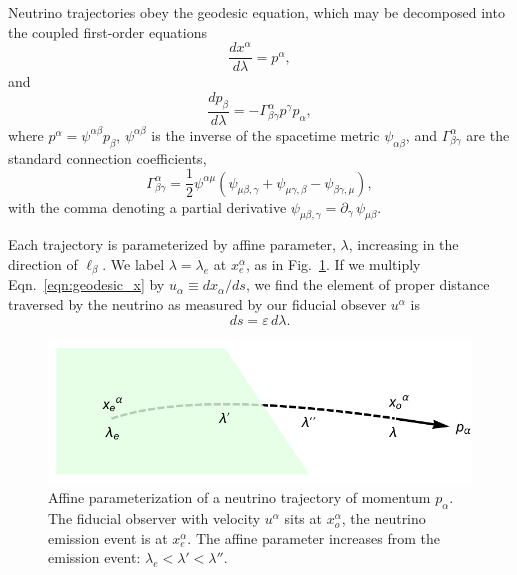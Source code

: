 \documentclass[aps,floatfix,prd,superscriptaddress,twocolumn]{revtex4-1}
\begin{document}
Neutrino trajectories obey the geodesic equation, which may be decomposed into
the coupled first-order equations
\begin{equation}
\label{eqn:geodesic_x}
  \frac{d x^\alpha}{d\lambda} = p^\alpha,
\end{equation}
and
\begin{equation}
\label{eqn:geodesic_p}
  \frac{d p_\beta}{d\lambda} = -\Gamma^\alpha_{\beta\gamma} p^\gamma p_\alpha,
\end{equation}
where $p^\alpha=\psi^{\alpha\beta}p_\beta$,
$\psi^{\alpha\beta}$ is the inverse of the spacetime metric $\psi_{\alpha\beta}$,
and $\Gamma^\alpha_{\beta\gamma}$ are the standard connection coefficients,
\begin{equation}
  \label{eqn:christoffel}
  \Gamma^\alpha_{\beta\gamma} =
  \frac{1}{2} \psi^{\alpha\mu}
  (\psi_{\mu\beta,\gamma} + \psi_{\mu\gamma,\beta} - \psi_{\beta\gamma,\mu}),
\end{equation}
with the comma denoting a partial derivative
$\psi_{\mu\beta,\gamma}=\partial_\gamma\,\psi_{\mu\beta}$.

Each trajectory is parameterized by affine parameter, $\lambda$, increasing in
the direction of $\ell_\beta$. We label $\lambda=\lambda_e$ at $x^\alpha_e$,
as in Fig.~\ref{fig:affine_param}.
If we multiply Eqn.~\ref{eqn:geodesic_x} by $u_\alpha \equiv dx_\alpha/ds$,
we find the element of proper distance traversed by the
neutrino as measured by our fiducial obsever $u^\alpha$ is
\begin{equation}
  \label{eqn:proper_length}
  ds=\varepsilon \,d\lambda.
\end{equation}

\begin{figure}
  \includegraphics[width=\columnwidth]{fig-affine_parameter_label}
  \caption{Affine parameterization of a neutrino trajectory of momentum
    $p_\alpha$.
    The fiducial observer with velocity $u^\alpha$ sits at $x^\alpha_o$,
    the neutrino emission event is at $x^\alpha_e$. The affine parameter
    increases from the emission event: $\lambda_e<\lambda'<\lambda''$.}
  \label{fig:affine_param}
\end{figure}
\end{document}
